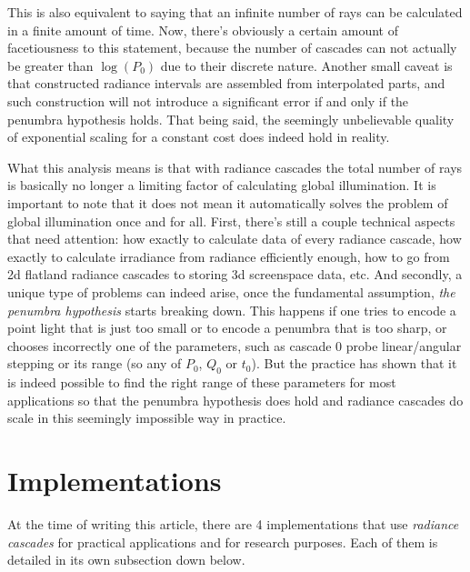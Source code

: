 \documentclass{jcgt}
\begin{document}
This is also equivalent to saying that an infinite number of rays can be calculated in a finite amount of time. Now, there's obviously a certain amount of facetiousness to this statement, because the number of cascades can not actually be greater than $\log(P_0)$ due to their discrete nature.
Another small caveat is that constructed radiance intervals are assembled from interpolated parts, and such construction will not introduce a significant error if and only if the penumbra hypothesis holds. That being said, the seemingly unbelievable quality of exponential scaling for a constant cost does indeed hold in reality.

What this analysis means is that with radiance cascades the total number of rays is basically no longer a limiting factor of calculating global illumination. It is important to note that it does not mean it automatically solves the problem of global illumination once and for all. First, there's still a couple technical aspects that need attention: how exactly to calculate data of every radiance cascade, how exactly to calculate irradiance from radiance efficiently enough, how to go from 2d flatland radiance cascades to storing 3d screenspace data, etc. And secondly, a unique type of problems can indeed arise, once the fundamental assumption, \emph{the penumbra hypothesis} starts breaking down. This happens if one tries to encode a point light that is just too small or to encode a penumbra that is too sharp, or chooses incorrectly one of the parameters, such as cascade 0 probe linear/angular stepping or its range (so any of $P_0$, $Q_0$ or $t_0$). But the practice has shown that it is indeed
possible to find the right range of these parameters for most applications so that the penumbra hypothesis does hold and radiance cascades do scale in this seemingly impossible way in practice.
\section{Implementations}
At the time of writing this article, there are 4 implementations that use \emph{radiance cascades} for practical applications and for research purposes. Each of them is detailed in its own subsection down below.
\end{document}
